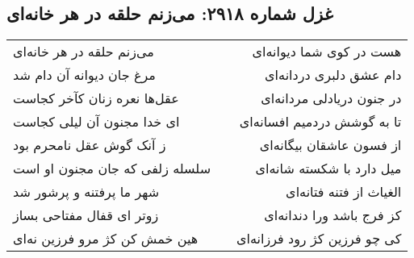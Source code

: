 \begin{center}
\section*{غزل شماره ۲۹۱۸: می‌زنم حلقه در هر خانه‌ای}
\label{sec:2918}
\begin{longtable}{l p{0.5cm} r}
می‌زنم حلقه در هر خانه‌ای
&&
هست در کوی شما دیوانه‌ای
\\
مرغ جان دیوانه آن دام شد
&&
دام عشق دلبری دردانه‌ای
\\
عقل‌ها نعره زنان کآخر کجاست
&&
در جنون دریادلی مردانه‌ای
\\
ای خدا مجنون آن لیلی کجاست
&&
تا به گوشش دردمیم افسانه‌ای
\\
ز آنک گوش عقل نامحرم بود
&&
از فسون عاشقان بیگانه‌ای
\\
سلسله زلفی که جان مجنون او است
&&
میل دارد با شکسته شانه‌ای
\\
شهر ما پرفتنه و پرشور شد
&&
الغیاث از فتنه فتانه‌ای
\\
زوتر ای قفال مفتاحی بساز
&&
کز فرج باشد ورا دندانه‌ای
\\
هین خمش کن کژ مرو فرزین نه‌ای
&&
کی چو فرزین کژ رود فرزانه‌ای
\\
\end{longtable}
\end{center}
